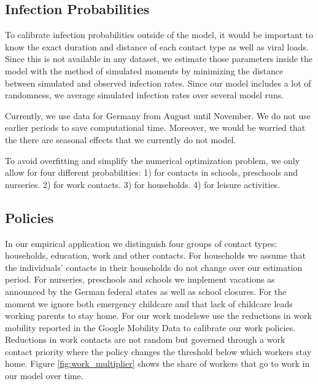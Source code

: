 \FloatBarrier


\subsection{Infection Probabilities}
\label{sec:estimation}

To calibrate infection probabilities outside of the model, it would be important to know
the exact duration and distance of each contact type as well as viral loads. Since this
is not available in any dataset, we estimate those parameters inside the model with the
method of simulated moments \citep{McFadden1989} by minimizing the distance between
simulated and observed infection rates. Since our model includes a lot of randomness, we
average simulated infection rates over several model runs.

Currently, we use data for Germany from August until November. We do not use earlier
periods to save computational time. Moreover, we would be worried that the there are
seasonal effects that we currently do not model.

To avoid overfitting and simplify the numerical optimization problem, we only allow for
four different probabilities: 1) for contacts in schools, preschools and nurseries. 2)
for work contacts. 3) for households. 4) for leisure activities.

\subsection{Policies}

\FloatBarrier

In our empirical application we distinguish four groups of contact types: households,
education, work and other contacts. For households we assume that the individuals'
contacts in their households do not change over our estimation period. For nurseries,
preschools and schools we implement vacations as announced by the German federal states
as well as school closures. For the moment we ignore both emergency childcare and that
lack of childcare leads working parents to stay home.
%
%
%
%
For our work models\footnotemark we use the reductions in work mobility reported in the
Google Mobility Data \citep{Google2021} to calibrate our work policies. Reductions in
work contacts are not random but governed through a work contact priority where the
policy changes the threshold below which workers stay home. Figure
\ref{fig:work_multiplier} shows the share of workers that go to work in our model over
time.

